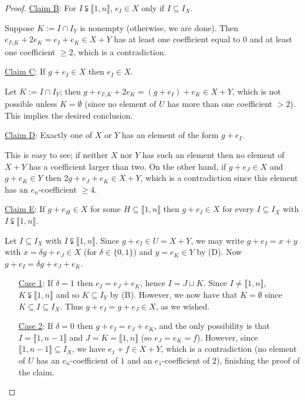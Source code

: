 \documentclass{report}
\newcommand{\llb}{\llbracket}
\newcommand{\rrb}{\rrbracket}
\renewcommand{\:}{\text{:}}
\theoremstyle{definition}
\begin{document}
\begin{proof}
\noindent\underline{Claim B}: For $I\subsetneqq \llb 1,n \rrb$, $e_I\in X$ only if $I\subseteq I_X$.

Suppose $K := I \cap I_Y$ is nonempty (otherwise, we are done).
Then $e_{I\setminus K} + 2e_K = e_I + e_K \in X +Y$ has at least one coefficient equal to $0$ and at least one coefficient $\ge 2$, which is a contradiction.

\noindent\underline{Claim C}: If $g + e_I\in X$ then $e_I\in X$. 

Let $K := I\cap I_Y$; then $g + e_{I\setminus K} + 2e_K = (g+e_I) + e_K \in X+Y$, which is not possible unless $K=\emptyset$ (since no element of $U$ has more than one coefficient $>2$).
This implies the desired conclusion.

\noindent\underline{Claim D}: Exactly one of $X$ or $Y$ has an element of the form $g + e_I$. 

This is easy to see; if neither $X$ nor $Y$ has such an element then no element of $X+Y$ has a coefficient larger than two.
On the other hand, if $g+e_J\in X$ and $g+e_K\in Y$ then $2g + e_J + e_K \in X+Y$, which is a contradiction since this element has an $e_n$-coefficient $\ge 4$.

\noindent\underline{Claim E}: If $g+ e_H\in X$ for some $H\subseteq \llb 1,n \rrb$ then $g + e_I \in X$ for every $I\subseteq I_X$ with $I\subsetneqq \llb 1,n\rrb$. 

Let $I \subseteq I_X$ with $I\subsetneqq \llb1,n\rrb$.
Since $g+e_I\in U = X+Y$, we may write $g+e_I = x +y$ with $x = \delta g + e_J\in X$ (for $\delta\in \{0,1\}$) and $y=e_K\in Y$ by (D).
Now $g + e_I = \delta g + e_J + e_K$.
\begin{itemize}
\item[\underline{Case 1}:] If $\delta = 1$ then $e_I = e_J + e_K$, hence $I = J\sqcup K$. 
Since $I\neq \llb1,n\rrb$, $K\subsetneqq \llb 1,n \rrb$ and so $K\subseteq I_Y$ by (B).
However, we now have that $K = \emptyset$ since $K\subseteq I \subseteq I_X$.
Thus $g + e_I = g + e_J \in X$, as we wished.
\item[\underline{Case 2}:] If $\delta = 0$ then $g + e_I = e_J + e_K$, and the only possibility is that $I = \llb 1,n-1\rrb$ and $J = K = \llb 1,n\rrb$ (so $e_J = e_K = f$).
However, since $\llb 1,n-1 \rrb \subseteq I_X$, we have $e_1 + f \in X+Y$, which is a contradiction (no element of $U$ has an $e_n$-coefficient of $1$ and an $e_1$-coefficient of $2$), finishing the proof of the claim.
\end{itemize}


\end{proof}
\end{document}
